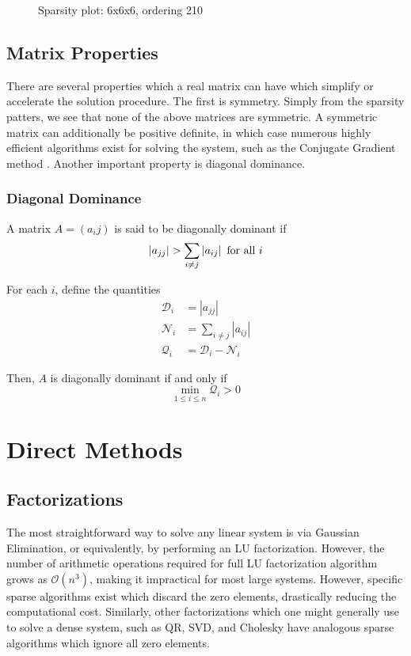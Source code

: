 \documentclass[10pt]{article}
\newcommand\DD{\mathcal{D}}
\newcommand\QQ{\mathcal{Q}}
\newcommand\NN{\mathcal{N}}
\newcommand\abs[1]{\left| #1 \right|}
\begin{document}
\begin{multicols}{2}
\begin{center}
\begin{minipage}[t]{.5\textwidth}
\begin{figure}[H]
    \caption{Sparsity plot: 6x6x6, ordering 210 }
\end{figure}
\end{minipage}%
\end{center}
\pagebreak

\subsection{Matrix Properties}
There are several properties which a real matrix can have which simplify or accelerate the solution procedure.
The first is symmetry.
Simply from the sparsity patters, we see that none of the above matrices are symmetric.
A symmetric matrix can additionally be positive definite, in which case numerous highly efficient algorithms exist for solving the system, such as the Conjugate Gradient method \citep{nocedal_numerical_1999}.
Another important property is diagonal dominance.

\subsubsection{Diagonal Dominance}
\label{sec:ddom}

A matrix $A=(a_ij)$ is said to be diagonally dominant if
\begin{equation}
	\abs{a_{jj}} > \sum_{i\neq j}\abs{a_{ij}} \,\, \mbox{for all}\,\, i \\
\end{equation}

For each $i$, define the quantities
\begin{align}
	\DD_i &= \abs{a_{jj}} \\
	\NN_i &= \sum_{i\neq j}\abs{a_{ij}} \\
	\QQ_i &= \DD_i - \NN_i
\end{align}

Then, $A$ is diagonally dominant if and only if
\begin{equation}
	\min_{1\leq i \leq n} \QQ_i > 0
\end{equation}

\section{Direct Methods}
\subsection{Factorizations}
The most straightforward way to solve any linear system is via Gaussian Elimination, or equivalently, by performing an LU factorization.
However, the number of arithmetic operations required for full LU factorization algorithm grows as $\mathcal{O}(n^3)$, making it impractical for most large systems.
However, specific sparse algorithms exist which discard the zero elements, drastically reducing the computational cost.
Similarly, other factorizations which one might generally use to solve a dense system, such as QR, SVD, and Cholesky have analogous sparse algorithms which ignore all zero elements.


\end{multicols}
\end{document}
